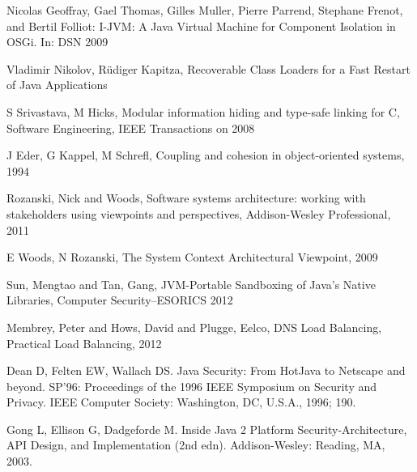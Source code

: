 \begin{thebibliography}{99}
 Nicolas Geoffray, Gael Thomas, Gilles Muller, Pierre Parrend, Stephane Frenot, and Bertil Folliot: I-JVM: A Java Virtual Machine for Component Isolation in OSGi. In: DSN 2009

 Vladimir Nikolov, Rüdiger Kapitza, Recoverable Class Loaders for a Fast Restart of
Java Applications

 S Srivastava, M Hicks, Modular information hiding and type-safe linking for C, Software Engineering, IEEE Transactions on 2008

 J Eder, G Kappel, M Schrefl, Coupling and cohesion in object-oriented systems, 1994

 Rozanski, Nick and Woods, Software systems architecture: working with stakeholders using viewpoints and perspectives, Addison-Wesley Professional, 2011

 E Woods, N Rozanski, The System Context Architectural Viewpoint, 2009

 Sun, Mengtao and Tan, Gang, JVM-Portable Sandboxing of Java's Native Libraries, Computer Security--ESORICS 2012

 Membrey, Peter and Hows, David and Plugge, Eelco, DNS Load Balancing, Practical Load Balancing, 2012

 Dean D, Felten EW, Wallach DS. Java Security: From HotJava to Netscape and beyond. SP'96: Proceedings of the 1996 IEEE Symposium on Security and Privacy. IEEE Computer Society: Washington, DC, U.S.A., 1996; 190.

 Gong L, Ellison G, Dadgeforde M. Inside Java 2 Platform Security-Architecture, API Design, and Implementation (2nd edn). Addison-Wesley: Reading, MA, 2003.
 

\end{thebibliography}